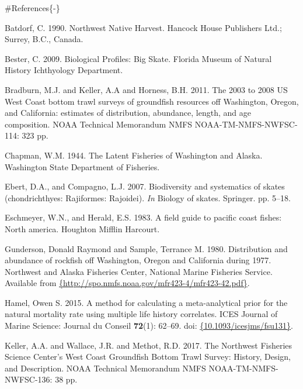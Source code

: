 \documentclass[12pt,]{article}
\begin{document}
\color{black}

\#References\{-\}

\renewcommand{\thepage}{}

\hypertarget{refs}{}
\leavevmode\hypertarget{ref-Batdorf1990}{}%
Batdorf, C. 1990. Northwest Native Harvest. Hancock House Publishers
Ltd.; Surrey, B.C., Canada.

\leavevmode\hypertarget{ref-Bester2009}{}%
Bester, C. 2009. Biological Profiles: Big Skate. Florida Museum of
Natural History Ichthyology Department.

\leavevmode\hypertarget{ref-Bradburn2011}{}%
Bradburn, M.J. and Keller, A.A and Horness, B.H. 2011. The 2003 to 2008
US West Coast bottom trawl surveys of groundfish resources off
Washington, Oregon, and California: estimates of distribution,
abundance, length, and age composition. NOAA Technical Memorandum NMFS
NOAA-TM-NMFS-NWFSC-114: 323 pp.

\leavevmode\hypertarget{ref-Chapman1944}{}%
Chapman, W.M. 1944. The Latent Fisheries of Washington and Alaska.
Washington State Department of Fisheries.

\leavevmode\hypertarget{ref-Ebert2007biodiversity}{}%
Ebert, D.A., and Compagno, L.J. 2007. Biodiversity and systematics of
skates (chondrichthyes: Rajiformes: Rajoidei). \emph{In} Biology of
skates. Springer. pp. 5--18.

\leavevmode\hypertarget{ref-Eschmeyer1983}{}%
Eschmeyer, W.N., and Herald, E.S. 1983. A field guide to pacific coast
fishes: North america. Houghton Mifflin Harcourt.

\leavevmode\hypertarget{ref-Gunderson1980}{}%
Gunderson, Donald Raymond and Sample, Terrance M. 1980. Distribution and
abundance of rockfish off Washington, Oregon and California during 1977.
Northwest and Alaska Fisheries Center, National Marine Fisheries
Service. Available from
\href{\%7Bhttp://spo.nmfs.noaa.gov/mfr423-4/mfr423-42.pdf\%7D}{\{http://spo.nmfs.noaa.gov/mfr423-4/mfr423-42.pdf\}}.

\leavevmode\hypertarget{ref-Hamel2015}{}%
Hamel, Owen S. 2015. A method for calculating a meta-analytical prior
for the natural mortality rate using multiple life history correlates.
ICES Journal of Marine Science: Journal du Conseil \textbf{72}(1):
62--69. doi:
\href{https://doi.org/\%7B10.1093/icesjms/fsu131\%7D}{\{10.1093/icesjms/fsu131\}}.

\leavevmode\hypertarget{ref-Keller2017}{}%
Keller, A.A. and Wallace, J.R. and Methot, R.D. 2017. The Northwest
Fisheries Science Center's West Coast Groundfish Bottom Trawl Survey:
History, Design, and Description. NOAA Technical Memorandum NMFS
NOAA-TM-NMFS-NWFSC-136: 38 pp.
\end{document}
